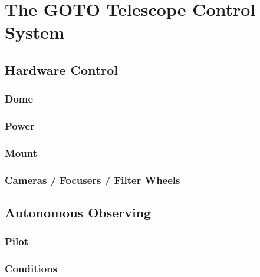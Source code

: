 \chapter{The GOTO Telescope Control System}
\label{chap:gtecs}
\chaptoc{}

\newpage
\section{Hardware Control}
\label{sec:daemons}

\lipsum{}

\subsection{Dome}
\label{sec:daemons-dome}

\lipsum{}

\subsection{Power}
\label{sec:daemons-power}

\lipsum{}

\subsection{Mount}
\label{sec:daemons-mount}

\lipsum{}

\subsection{Cameras / Focusers / Filter Wheels}
\label{sec:daemons-fli}

\lipsum{}


\newpage
\section{Autonomous Observing}
\label{sec:autonomous}

\lipsum{}

\subsection{Pilot}
\label{sec:autonomous-pilot}

\lipsum{}

\subsection{Conditions}
\label{sec:autonomous-conditions}

